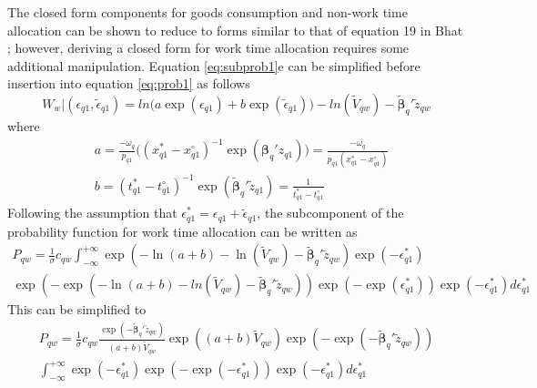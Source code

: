 The closed form components for goods consumption and non-work time allocation can be shown to reduce to forms similar to that of equation 19 in Bhat \cite{Bhat2008TheExtensions}; however, deriving a closed form for work time allocation requires some additional manipulation. Equation \ref{eq:subprob1}e can be simplified before insertion into equation \ref{eq:prob1} as follows
\begin{equation}
    W_w|(\epsilon_{q1},\widetilde{\epsilon}_{q1}) = ln \Bigg( a \exp (\epsilon_{q1}) + b \exp (\widetilde{\epsilon}_{q1})\Bigg) - ln\left(\widetilde{V}_{qw} \right) - \bm{\widetilde{\beta}}_q' \widetilde{z}_{qw}
\end{equation}
where 
\begin{subequations}\label{eq:subprob2}
\begin{align}
        &a = \frac{-\omega_q}{p_{q1}} \Big( (x_{q1}^* - x_{q1}^\circ)^{-1} \exp (\bm{\beta}_q' z_{q1})\Big) = \frac{-\omega_q}{p_{q1}(x_{q1}^* - x_{q1}^\circ)} \\
        &b = (t_{q1}^* - t_{q1}^\circ)^{-1} \exp ( \bm{\widetilde{\beta}}_q' \widetilde{z}_{q1}) = \frac{1}{t_{q1}^* - t_{q1}^\circ}
\end{align}
\end{subequations}
Following the assumption that $\epsilon_{q1}^* = \epsilon_{q1} + \widetilde{\epsilon}_{q1}$, the subcomponent of the probability function for work time allocation can be written as
\begin{equation}\label{eq:prob2}
    \begin{split} P_{qw} = \frac{1}{\sigma} c_{qw} \int_{-\infty}^{+\infty} \exp\left(-\ln\left(a+b\right)-\ln\left(\widetilde{V}_{qw} \right) - \bm{\widetilde{\beta}}_q' \widetilde{z}_{qw} \right) \exp\left(-\epsilon_{q1}^* \right) \\
    \exp\left(-\exp\left(-\ln\left(a+b\right)-ln\left(\widetilde{V}_{qw} \right) - \bm{\widetilde{\beta}}_q' \widetilde{z}_{qw} \right)\right) \exp\left( - \exp \left(\epsilon_{q1}^* \right)\right) \exp\left(-\epsilon_{q1}^* \right) d\epsilon_{q1}^* \end{split}
\end{equation}
This can be simplified to
\begin{equation}\label{eq:prob3}
    \begin{split} P_{qw} = \frac{1}{\sigma} c_{qw} \frac{\exp \left(- \bm{\widetilde{\beta}}_q' \widetilde{z}_{qw} \right) }{\left(a+b\right)\widetilde{V}_{qw}} \exp\left(\left(a+b\right)\widetilde{V}_{qw}\right) \exp\left( - \exp \left(-\bm{\widetilde{\beta}}_q' \widetilde{z}_{qw} \right)\right) \\  \int_{-\infty}^{+\infty} \exp\left(-\epsilon_{q1}^* \right) \exp\left( - \exp \left(-\epsilon_{q1}^* \right)\right) \exp\left(-\epsilon_{q1}^* \right) d\epsilon_{q1}^* \end{split}
\end{equation}

